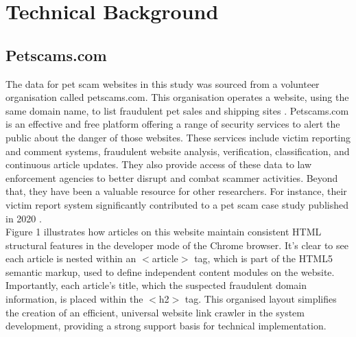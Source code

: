 \documentclass[ oneside,%
                    author={Cassie Qing Tang},
                    degree={BSc},
                     title={An Automated Response System for Disrupting Online Pet Scamming \\ },
                    subtitle={ }]{dissertation}
\begin{document}
\chapter{Technical Background}
\section{Petscams.com}
The data for pet scam websites in this study was sourced from a volunteer organisation called petscams.com. This organisation operates a website, using the same domain name, to list fraudulent pet sales and shipping sites \cite{brady_fighting_2024}. Petscams.com is an effective and free platform offering a range of security services to alert the public about the danger of those websites. These services include victim reporting and comment systems, fraudulent website analysis, verification, classification, and continuous article updates. They also provide access of these data to law enforcement agencies to better disrupt and combat scammer activities. Beyond that, they have been a valuable resource for other researchers. For instance, their victim report system significantly contributed to a pet scam case study published in 2020 \cite{whittaker_understanding_2020}.
\\

Figure 1 illustrates how articles on this website maintain consistent HTML structural features in the developer mode of the Chrome browser. It's clear to see each article is nested within an $<$article$>$ tag, which is part of the HTML5 semantic markup, used to define independent content modules on the website. Importantly, each article's title, which the suspected fraudulent domain information, is placed within the $<$h2$>$ tag. This organised layout simplifies the creation of an efficient, universal website link crawler in the system development, providing a strong support basis for technical implementation.
\\
\end{document}
